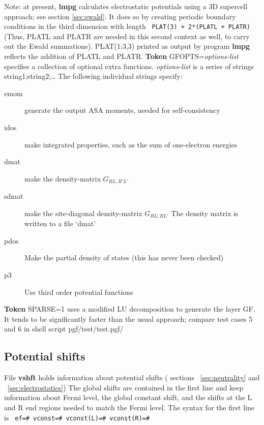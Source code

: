 \documentclass{article}
\begin{document}
\vskip 12pt
\noindent
Note: at present, {\bf lmpg} calculates electrostatic potentials using
a 3D supercell approach; see section \ref{sec:ewald}.  It does so by creating periodic boundary
conditions in the third dimension with length
{\tt
\vskip 6pt
   PLAT(3) + 2*(PLATL + PLATR)
\vskip 6pt
}
\noindent
(Thus, PLATL and PLATR are needed in this second context as well,
to carry out the Ewald summations).  PLAT(1:3,3) printed as
output by program {\bf lmpg} reflects the addition of PLATL and
PLATR.
\vskip 12pt
\noindent
{\bf Token} GFOPTS={\em options-list}
\vskip 12pt
\noindent
specifies a collection of optional extra functions.  {\em options-list} is
a series of strings string1;string2;\dots
The following individual strings specify:
\begin{description}
  \item[emom]   generate the output ASA moments, needed for self-consistency

  \item[idos]   make integrated properties, such as the sum of one-electron energies

  \item[dmat]   make the density-matrix $G_{RL,R'L'}$

  \item[sdmat]  make the site-diagonal density-matrix $G_{RL,RL'}$
                The density matrix is written to a file `dmat'

  \item[pdos]   Make the partial density of states (this has never been checked)


  \item[p3]     Use third order potential functions
\end{description}

\vskip 12pt
\noindent
{\bf Token} SPARSE=1
\vskip 12pt
\noindent
uses a modified LU decomposition to generate
the layer GF.  It tends to be significantly faster than the usual
approach; compare test cases 5 and 6 in shell script pgf/test/test.pgf/

\subsection{Potential shifts}

File {\bf vshft} holds information about potential shifts (
sections ~\ref{sec:neutrality} and ~\ref{sec:electrostatics})
The global shifts are contained in the first line and keep
information about Fermi level, the global constant shift,
and the shifts at the L and R end regions needed to match the
Fermi level.  The syntax for the first line is
{\tt
\vskip 6pt
 ef=\# vconst=\# vconst(L)=\# vconst(R)=\#
\vskip 6pt
}
\end{document}
